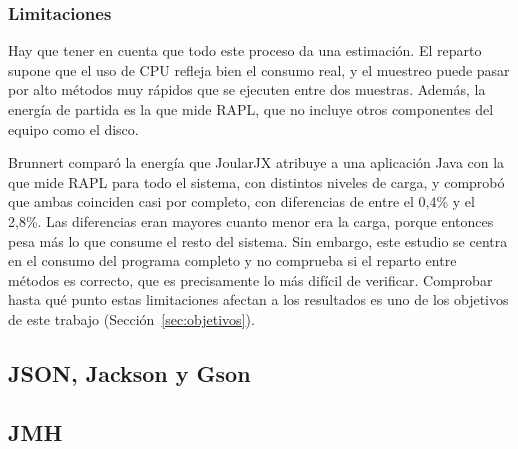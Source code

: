 \subsubsection{Limitaciones}
\label{subsubsec:limitaciones-joularjx}

Hay que tener en cuenta que todo este proceso da una estimación. El reparto
supone que el uso de CPU refleja bien el consumo real, y el muestreo puede
pasar por alto métodos muy rápidos que se ejecuten entre dos muestras. Además,
la energía de partida es la que mide RAPL, que no incluye otros componentes del
equipo como el disco.

Brunnert \cite{brunnert2025accuracy} comparó la energía que JoularJX atribuye a
una aplicación Java con la que mide RAPL para todo el sistema, con distintos
niveles de carga, y comprobó que ambas coinciden casi por completo, con
diferencias de entre el 0,4\% y el 2,8\%. Las diferencias eran mayores cuanto
menor era la carga, porque entonces pesa más lo que consume el resto del
sistema. Sin embargo, este estudio se centra en el consumo del programa
completo y no comprueba si el reparto entre métodos es correcto, que es
precisamente lo más difícil de verificar. Comprobar hasta qué punto estas
limitaciones afectan a los resultados es uno de los objetivos de este trabajo
(Sección~\ref{sec:objetivos}).


\subsection{JSON, Jackson y Gson}
\label{subsec:json-jackson-gson}



\subsection{JMH}
\label{subsec:jmh}



